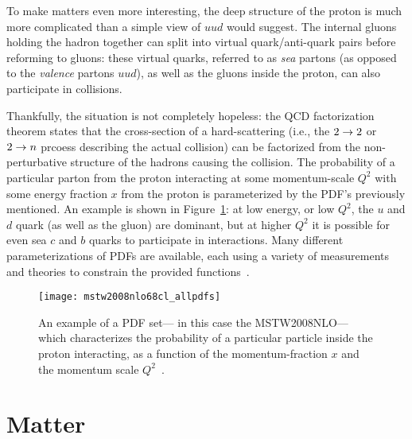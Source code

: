 To make matters even more interesting, the deep structure of the proton is much more complicated than a simple view of $uud$ would suggest. The internal gluons holding the hadron together can split into virtual quark/anti-quark pairs before reforming to gluons: these virtual quarks, referred to as \textit{sea} partons (as opposed to the \textit{valence} partons $uud$), as well as the gluons inside the proton, can also participate in collisions.

Thankfully, the situation is not completely hopeless: the QCD factorization theorem states that the cross-section of a hard-scattering (i.e., the $2\rightarrow2$ or $2\rightarrow n$ prcoess describing the actual collision) can be factorized from the non-perturbative structure of the hadrons causing the collision. The probability of a particular parton from the proton interacting at some momentum-scale $Q^2$ with some energy fraction $x$ from the proton is parameterized by the PDF's previously mentioned. An example is shown in Figure~\ref{fig:sm:pdf}: at low energy, or low $Q^2$, the $u$ and $d$ quark (as well as the gluon) are dominant, but at higher $Q^2$ it is possible for even sea $c$ and $b$ quarks to participate in interactions. Many different parameterizations of PDFs are available, each using a variety of measurements and theories to constrain the provided functions~\cite{Whalley:2005nh,PDF-MRST,PDF-CTEQ,Ball:2008by,Ball:2010de,cteq6l1,Martin:2009iq,Botje:2011sn}.




\begin{figure}
\centering
\texttt{[image: mstw2008nlo68cl\_allpdfs]}
\caption{An example of a PDF set--- in this case the MSTW2008NLO--- which characterizes the probability of a particular particle inside the proton interacting, as a function of the momentum-fraction $x$ and the momentum scale $Q^2$~\cite{Martin:2009iq}.}
\label{fig:sm:pdf}
\end{figure}




\section{Matter}
\label{chapter:sm:matter}

